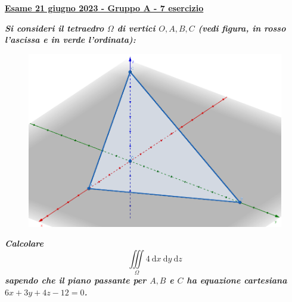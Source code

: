 \documentclass[a4paper]{article}
\newcommand{\definition}[1]{\textcolor{Red3}{\textbf{#1}}}
\newcommand{\example}[1]{\textcolor{Green4}{\textbf{#1}}}
\begin{document}
	\begin{flushleft}
		\label{exam: esame 21 giugno 2023 - Gruppo A - 7 esercizio}
		\hypertarget{
			exam: esame 21 giugno 2023 - Gruppo A - 7 esercizio
		}{
			\definition{\underline{Esame 21 giugno 2023 - Gruppo A - 7 esercizio}}
		}
	\end{flushleft}
	\example{\emph{Si consideri il tetraedro $\Omega$ di vertici $O, A, B, C$ (vedi figura, in rosso l'ascissa e in verde l'ordinata):}}
	\begin{figure}[!htp]
		\centering
		\includegraphics[width=.7\textwidth]{img/exercise/2023-06-21-A-ex7.png}
	\end{figure}

	\noindent
	\example{\emph{Calcolare}
	\begin{equation*}
		\displaystyle\iiint\limits_{\Omega} 4 \:\mathrm{d}x\:\mathrm{d}y\:\mathrm{d}z
	\end{equation*}
	\emph{sapendo che il piano passante per $A, B$ e $C$ ha equazione cartesiana $6x+3y+4z-12=0$.}}\newline
\end{document}
